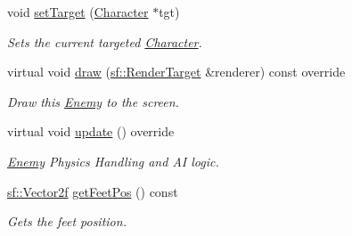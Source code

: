 \begin{DoxyCompactItemize}
void \mbox{\hyperlink{class_enemy_abc6aabdcf4d373bec18ca76fa3a6252b}{set\+Target}} (\mbox{\hyperlink{class_character}{Character}} $\ast$tgt)
\begin{DoxyCompactList}\small\item\em Sets the current targeted \mbox{\hyperlink{class_character}{Character}}. \end{DoxyCompactList}\item 
virtual void \mbox{\hyperlink{class_enemy_a909cfc93e50506d0e2c62e5fd231e05a}{draw}} (\mbox{\hyperlink{classsf_1_1_render_target}{sf\+::\+Render\+Target}} \&renderer) const override
\begin{DoxyCompactList}\small\item\em Draw this \mbox{\hyperlink{class_enemy}{Enemy}} to the screen. \end{DoxyCompactList}\item 
\mbox{\label{class_enemy_aa70d742da02995011f1618acc9e303db}} 
virtual void \mbox{\hyperlink{class_enemy_aa70d742da02995011f1618acc9e303db}{update}} () override
\begin{DoxyCompactList}\small\item\em \mbox{\hyperlink{class_enemy}{Enemy}} Physics Handling and AI logic. \end{DoxyCompactList}\item 
\mbox{\label{class_enemy_a8a195d535523e678d4a827a0f00b3159}} 
\mbox{\hyperlink{classsf_1_1_vector2}{sf\+::\+Vector2f}} \mbox{\hyperlink{class_enemy_a8a195d535523e678d4a827a0f00b3159}{get\+Feet\+Pos}} () const
\begin{DoxyCompactList}\small\item\em Gets the feet position. \end{DoxyCompactList}\end{DoxyCompactItemize}

